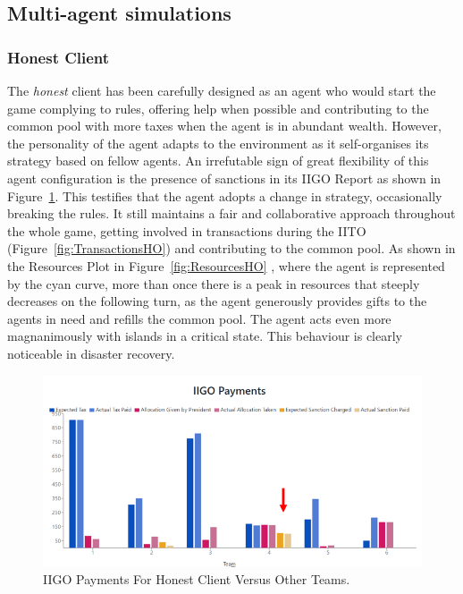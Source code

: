 \subsection{Multi-agent simulations} \label{againstothers}
\subsubsection{Honest Client} \label{honestAO}
The \emph{honest} client has been carefully designed as an agent who would start the game complying to rules, offering help when possible and contributing to the common pool with more taxes when the agent is in abundant wealth. However, the personality of the agent adapts to the environment as it self-organises its strategy based on fellow agents. An irrefutable sign of great flexibility of this agent configuration is the presence of sanctions in its IIGO Report as shown in Figure~\ref{fig:IIGOHO}.
This testifies that the agent adopts a change in strategy, occasionally breaking the rules. It still maintains a fair and collaborative approach throughout the whole game, getting involved in transactions during the IITO (Figure~\ref{fig:TransactionsHO}) and contributing to the common pool. As shown in the Resources Plot in Figure~\ref{fig:ResourcesHO} , where the agent is represented by the cyan curve, more than once there is a peak in resources that steeply decreases on the following turn, as the agent generously provides gifts to the agents in need and refills the common pool. The agent acts even more magnanimously with islands in a critical state. This behaviour is clearly noticeable in disaster recovery.
\begin{figure}[H]
\centering
\includegraphics[scale=0.6]{12_team4_agentdesign/images/IIGOHO.PNG}
\caption{IIGO Payments For Honest Client Versus Other Teams.}
\label{fig:IIGOHO}
\end{figure}

